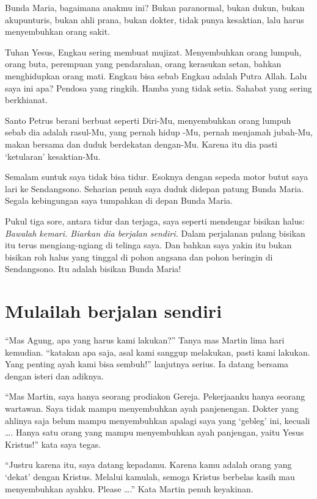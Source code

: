 	Bunda Maria, bagaimana anakmu ini? Bukan paranormal, bukan dukun, bukan akupunturis, bukan ahli prana, bukan dokter, tidak punya kesaktian, lalu harus menyembuhkan orang sakit.

	Tuhan Yesus, Engkau sering membuat mujizat. Menyembuhkan orang lumpuh, orang buta, perempuan yang pendarahan, orang kerasukan setan, bahkan menghidupkan orang mati. Engkau bisa sebab Engkau adalah Putra Allah. Lalu saya ini apa? Pendosa yang ringkih. Hamba yang tidak setia. Sahabat yang sering berkhianat.

	Santo Petrus berani berbuat seperti Diri-Mu, menyembuhkan orang lumpuh sebab dia adalah rasul-Mu, yang pernah hidup -Mu, pernah menjamah jubah-Mu, makan bersama dan duduk berdekatan dengan-Mu. Karena itu dia pasti ‘ketularan’ kesaktian-Mu.

	Semalam suntuk saya tidak bisa tidur. Esoknya dengan sepeda motor butut saya lari ke Sendangsono. Seharian penuh saya duduk didepan patung Bunda Maria. Segala kebingungan saya tumpahkan di depan Bunda Maria.

	Pukul tiga sore, antara tidur dan terjaga, saya seperti mendengar bisikan halus: \textit{Bawalah kemari. Biarkan dia berjalan sendiri.} Dalam perjalanan pulang bisikan itu terus mengiang-ngiang di telinga saya. Dan bahkan saya yakin itu bukan bisikan roh halus yang tinggal di pohon angsana dan pohon beringin di Sendangsono. Itu adalah bisikan Bunda Maria!

\section*{Mulailah berjalan sendiri}

	“Mas Agung, apa yang harus kami lakukan?” Tanya mas Martin lima hari kemudian. “katakan apa saja, asal kami sanggup melakukan, pasti kami lakukan. Yang penting ayah kami bisa sembuh!” lanjutnya serius. Ia datang bersama dengan isteri dan adiknya.

	“Mas Martin, saya hanya seorang prodiakon Gereja. Pekerjaanku hanya seorang wartawan. Saya tidak mampu menyembuhkan ayah panjenengan. Dokter yang ahlinya saja belum mampu menyembuhkan apalagi saya yang ‘gebleg’ ini, kecuali \ldots. Hanya satu orang yang mampu menyembuhkan ayah panjengan, yaitu Yesus Kristus!” kata saya tegas. 

	“Justru karena itu, saya datang kepadamu. Karena kamu adalah orang yang ‘dekat’ dengan Kristus. Melalui kamulah, semoga Kristus berbelas kasih mau menyembuhkan ayahku. Please \ldots.” Kata Martin penuh keyakinan.

